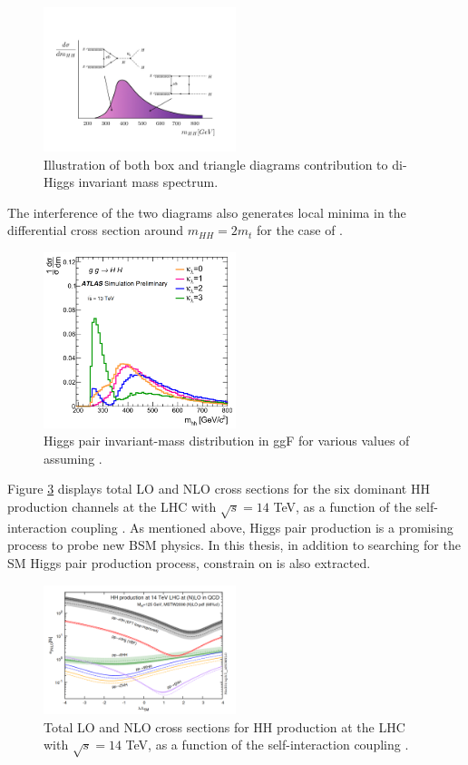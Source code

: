 \begin{figure}[htbp]
    \centering
    \includegraphics[width=0.5\textwidth]{Ch1/Img/illustration_mHH.jpeg}
    \caption{Illustration of both box and triangle diagrams contribution to di-Higgs invariant mass spectrum.}
    \label{fig:chap1:HH:BSM:I}
\end{figure}
The interference of the two diagrams also generates local minima in the differential cross section around $m_{HH}=2m_t$ for the case of .
\begin{figure}[htbp]
    \centering
    \includegraphics[width=0.5\textwidth]{Ch1/Img/mHH.png}
    \caption{Higgs pair invariant-mass distribution in ggF for various values of \kl assuming .}
    \label{fig:chap1:HH:BSM:MHH}
\end{figure}

Figure \ref{fig:chap1:HH:BSM:XSEC:L} displays total LO and NLO cross sections for the six dominant HH production channels at the LHC with $\sqrt{s}=14$ TeV, as a function of the self-interaction coupling \kl.  As mentioned above, Higgs pair production is a promising process to probe new BSM physics. In this thesis, in addition to searching for the SM Higgs pair production process, constrain on \kl is also extracted.
\begin{figure}[htbp]
    \centering
    \includegraphics[width=0.5\textwidth]{Ch1/Img/HH_Xsec_as_lambda.png}
    \caption{Total LO and NLO cross sections for HH production at the LHC with $\sqrt{s}=14$ TeV, as a function of the self-interaction coupling \kl.}
    \label{fig:chap1:HH:BSM:XSEC:L}
\end{figure}

